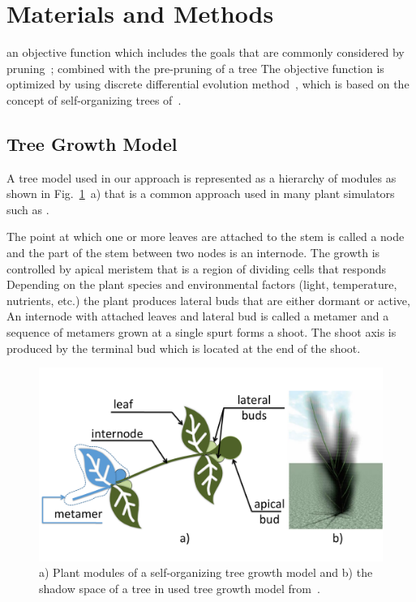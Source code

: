 \section{Materials and Methods}\label{sec:intro}
 an objective function which includes the goals that are commonly considered by pruning~\cite{}; combined
with the pre-pruning of a tree  
The objective function is optimized by using discrete differential evolution method~\cite{kohek_eduapple:_2015}, which is based on the
concept of self-organizing trees of~\cite{palubicki_self-organizing_2009}.


\subsection{Tree Growth Model}
A tree model used in our approach is represented as a hierarchy of
modules as shown in Fig.~\ref{fig:my_figure1}~a) that is a common approach used in many plant
simulators such as \cite{de_reffye_plant_1988,palubicki_self-organizing_2009,pirk_plastic_2012,prusinkiewicz_development_1988,stava_inverse_2014}. 

The point at which one or more leaves are attached to the stem is called a node and the part of the stem between two nodes is an internode. 
The growth is controlled by apical meristem that is a region of dividing cells that responds 
Depending on the plant species and environmental factors (light, temperature, nutrients, etc.) the plant produces lateral buds that are either dormant or active, 
An internode with attached leaves and lateral bud is called a metamer and a sequence of metamers grown at a single spurt forms a shoot. 
The shoot axis is produced by the terminal bud which is located at the end of the shoot.
\begin{figure}[hbt]
    \centering
    \includegraphics[width=4.5in]{figs/Fig1}
    \caption{a) Plant modules of a self-organizing tree growth
model and b) the shadow space of a tree in used tree growth model from~\cite{kohek_eduapple:_2015}.}
    \label{fig:my_figure1}
\end{figure}

